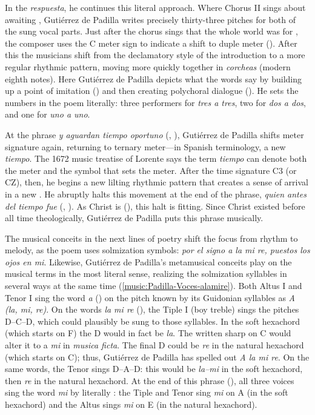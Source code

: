 In the \emph{respuesta}, he continues this literal approach.
Where Chorus II sings about awaiting , Gutiérrez de
Padilla writes precisely thirty-three pitches for both of the sung vocal parts.
Just after the chorus sings that the whole world was  for
, the composer uses the C meter sign to indicate a shift to
duple meter ().
After this the musicians shift from the declamatory style of the introduction to
a more regular rhythmic pattern, moving more quickly together in \emph{corcheas}
(modern eighth notes).
Here Gutiérrez de Padilla depicts what the words say by building up a point of
imitation  () and then
creating polychoral dialogue ().
He sets the numbers in the poem literally: three performers for \emph{tres a
tres}, two for \emph{dos a dos}, and one for \emph{uno a uno}.

At the phrase \emph{y aguardan tiempo oportuno} (, ), Gutiérrez de Padilla shifts meter signature
again, returning to ternary meter---in Spanish terminology, a new \emph{tiempo}.
The 1672 music treatise of Lorente says the term \emph{tiempo} can denote both
the meter and the symbol that sets the meter.%
    \Autocite[bk.~2, 149]{Lorente:Porque}
After the time signature C3 (or CZ), then, he begins a new lilting rhythmic
pattern that creates a sense of arrival in a new .
He abruptly halts this movement at the end of the phrase, \emph{quien antes del
tiempo fue} (, ).
As Christ is  (), this halt is
fitting.  
Since Christ existed before all time theologically, Gutiérrez de Padilla puts
this phrase  musically.

The musical conceits in the next lines of poetry shift the focus from rhythm to
melody, as the poem uses solmization symbols: \emph{por el signo a la mi re,
puestos los ojos en mi}.
Likewise, Gutiérrez de Padilla's metamusical conceits play on the musical terms
in the most literal sense, realizing the solmization syllables in several ways
at the same time (\cref{music:Padilla-Voces-alamire}).
Both Altus I and Tenor I sing the word \emph{a} () on the pitch
known by its Guidonian syllables as \emph{A (la, mi, re)}.
On the words \emph{la mi re} (), the Tiple I (boy treble) sings
the pitches D--C\sh{}--D, which could plausibly be sung to those syllables.
In the soft hexachord (which starts on F) the D would in fact be \emph{la}.
The written sharp on C would alter it to a \emph{mi} in \emph{musica ficta}. 
The final D could be \emph{re} in the natural hexachord (which starts on C);
thus, Gutiérrez de Padilla has spelled out \emph{A la mi re}.
On the same words, the Tenor sings D--A--D: this would be \emph{la--mi} in the
soft hexachord, then \emph{re} in the natural hexachord.
At the end of this phrase (), all three voices sing the word
\emph{mi} by literally : the Tiple and
Tenor sing \emph{mi} on A (in the soft hexachord) and the Altus sings \emph{mi}
on E (in the natural hexachord).

